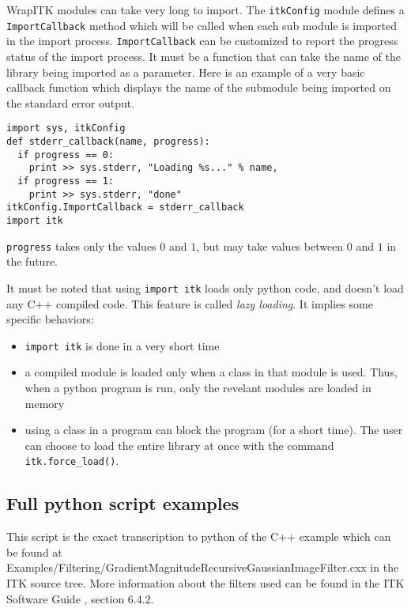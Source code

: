 \documentclass{InsightArticle}
\begin{document}
WrapITK modules can take very long to import. The \verb$itkConfig$ module defines
a \verb$ImportCallback$ method which will be called when each sub module is
imported in the import process. \verb$ImportCallback$ can be customized to report the
progress status of the import process. It must be a function that can take
the name of the library being imported as a parameter. Here is an example of a very
basic callback function which displays the name of the submodule being imported on
the standard error output.
\small \begin{verbatim}
import sys, itkConfig
def stderr_callback(name, progress):
  if progress == 0:
    print >> sys.stderr, "Loading %s..." % name,
  if progress == 1:
    print >> sys.stderr, "done"
itkConfig.ImportCallback = stderr_callback
import itk
\end{verbatim} \normalsize

\verb$progress$ takes only the values $0$ and $1$, but may take values between $0$ and $1$
in the future.

It must be noted that using \verb$import itk$ loads only python code, and doesn't load
any C++ compiled code. This feature is called {\em lazy loading}. It implies some specific
behaviors:
\begin{itemize}
 \item \verb$import itk$ is done in a very short time
 \item a compiled module is loaded only when a class in that module is used. Thus,
when a python program is run, only the revelant modules are loaded in memory
 \item using a class in a program can block the program (for a short time). The user
can choose to load the entire library at once with the command \verb$itk.force_load()$.
\end{itemize}

     \subsection{Full python script examples}

This script is the exact transcription to python of the C++ example
which can be found at Examples/Filtering/GradientMagnitudeRecursiveGaussianImageFilter.cxx
in the ITK source tree. More information about the filters used can be found in
the ITK Software Guide \cite{ITKSoftwareGuide}, section 6.4.2.
\end{document}
